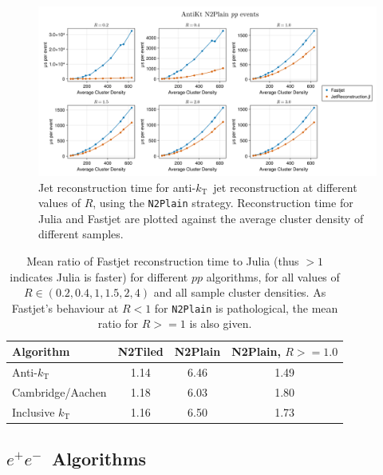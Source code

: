 \documentclass{webofc}
\newcommand{\kt}{${k}_\text{T}$}
\newcommand{\akt}{anti-${k}_\text{T}$}
\newcommand{\Akt}{Anti-${k}_\text{T}$}
\newcommand{\ee}{$e^+e^-$}
\begin{document}
\begin{figure}[th]
    \begin{center}
        \includegraphics[width=0.8\linewidth]{Alma9-AMD-Ryzen7-Julia-Fastjet-AntiKt-N2Plain-MultiR.png}
        \caption{Jet reconstruction time for \akt\ jet reconstruction at different values of $R$, using the \texttt{N2Plain} strategy. Reconstruction time for Julia and Fastjet are plotted against the average cluster density of different samples.}
        \label{fig:antiktPlainResults}
    \end{center}
\end{figure}

\begin{table}[th]
    \begin{center}
        \begin{tabular}{l|ccc}
            \textbf{Algorithm} & \textbf{N2Tiled} & \textbf{N2Plain} & \textbf{N2Plain}, $R>=1.0$ \\
            \hline
            \Akt & 1.14 & 6.46 & 1.49 \\
            Cambridge/Aachen & 1.18 & 6.03 & 1.80 \\
            Inclusive \kt & 1.16 & 6.50 & 1.73 \\
        \end{tabular}
        \caption{Mean ratio of Fastjet reconstruction time to Julia (thus $>1$ indicates Julia is faster) for different $pp$ algorithms, for all values of $R \in (0.2, 0.4, 1, 1.5, 2, 4)$ and all sample cluster densities. As Fastjet's behaviour at $R<1$ for \texttt{N2Plain} is pathological, the mean ratio for $R>=1$ is also given.}
        \label{tab:ppratios}
    \end{center}
\end{table}

\subsection{\ee\ Algorithms}
\label{sec:eeperf}
\end{document}
